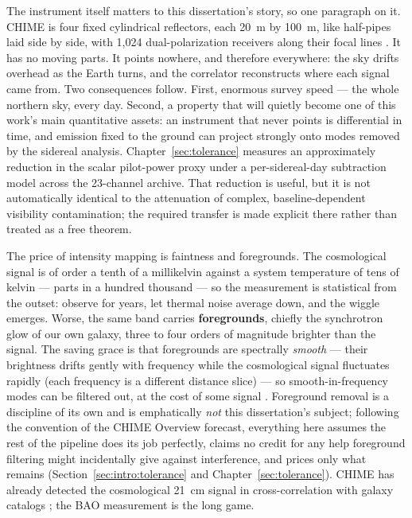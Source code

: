 The instrument itself matters to this dissertation's story, so one paragraph on it. CHIME is four fixed cylindrical reflectors, each 20~m by 100~m, like half-pipes laid side by side, with 1,024 dual-polarization receivers along their focal lines \cite{amiri2022chime}. It has no moving parts. It points nowhere, and therefore everywhere: the sky drifts overhead as the Earth turns, and the correlator reconstructs where each signal came from. Two consequences follow. First, enormous survey speed --- the whole northern sky, every day. Second, a property that will quietly become one of this work's main quantitative assets: an instrument that never points is differential in time, and emission fixed to the ground can project strongly onto modes removed by the sidereal analysis. Chapter~\ref{sec:tolerance} measures an approximately  reduction in the scalar pilot-power proxy under a per-sidereal-day subtraction model across the 23-channel archive. That reduction is useful, but it is not automatically identical to the attenuation of complex, baseline-dependent visibility contamination; the required transfer is made explicit there rather than treated as a free theorem.

The price of intensity mapping is faintness and foregrounds. The cosmological signal is of order a tenth of a millikelvin against a system temperature of tens of kelvin --- parts in a hundred thousand --- so the measurement is statistical from the outset: observe for years, let thermal noise average down, and the wiggle emerges. Worse, the same band carries \textbf{foregrounds}, chiefly the synchrotron glow of our own galaxy, three to four orders of magnitude brighter than the signal. The saving grace is that foregrounds are spectrally \emph{smooth} --- their brightness drifts gently with frequency while the cosmological signal fluctuates rapidly (each frequency is a different distance slice) --- so smooth-in-frequency modes can be filtered out, at the cost of some signal \cite{amiri2022chime,chime2024hybrid}. Foreground removal is a discipline of its own and is emphatically \emph{not} this dissertation's subject; following the convention of the CHIME Overview forecast, everything here assumes the rest of the pipeline does its job perfectly, claims no credit for any help foreground filtering might incidentally give against interference, and prices only what remains (Section~\ref{sec:intro:tolerance} and Chapter~\ref{sec:tolerance}). CHIME has already detected the cosmological 21~cm signal in cross-correlation with galaxy catalogs \cite{amiri2023detection}; the BAO measurement is the long game.

